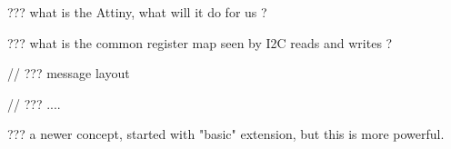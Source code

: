 
??? what is the Attiny, what will it do for us ?


??? what is the common register map seen by I2C reads and writes ?


// ??? message layout 


// ??? ....



??? a newer concept, started with "basic" extension, but this is more powerful.


